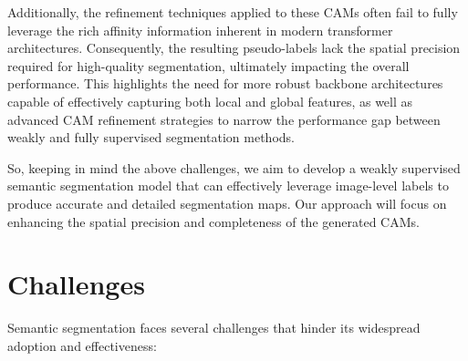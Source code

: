 Additionally, the refinement techniques applied to these CAMs often fail to fully leverage the rich affinity information inherent in modern transformer architectures. Consequently, the resulting pseudo-labels lack the spatial precision required for high-quality segmentation, ultimately impacting the overall performance. This highlights the need for more robust backbone architectures capable of effectively capturing both local and global features, as well as advanced CAM refinement strategies to narrow the performance gap between weakly and fully supervised segmentation methods.

So, keeping in mind the above challenges, we aim to develop a weakly supervised semantic segmentation model that can effectively leverage image-level labels to produce accurate and detailed segmentation maps. Our approach will focus on enhancing the spatial precision and completeness of the generated CAMs.

\section{Challenges}
\label{sec:challenges}
Semantic segmentation faces several challenges that hinder its widespread adoption and effectiveness:

